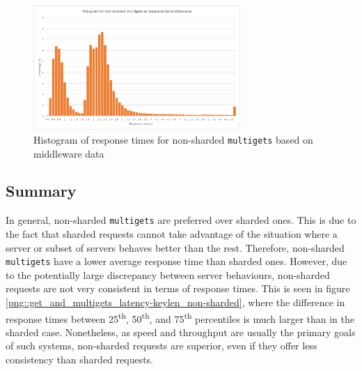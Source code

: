 \documentclass[11pt,a4paper]{article}
\begin{document}
\begin{figure}[!h]
    \centering
    \includegraphics[width=0.7\textwidth]{processing/graphics/get_and_multigets_hist_non-sharded_mws.png}
    \caption{Histogram of response times for non-sharded \texttt{multigets} based on middleware data}
    \label{png::get_and_multigets_hist_non-sharded_mws}
\end{figure}

\subsection{Summary}
In general, non-sharded \texttt{multigets} are preferred over sharded ones. This is due to the fact that sharded requests cannot take advantage of the situation where a server or subset of servers behaves better than the rest. Therefore, non-sharded \texttt{multigets} have a lower average response time than sharded ones. However, due to the potentially large discrepancy between server behaviours, non-sharded requests are not very consistent in terms of response times. This is seen in figure \ref{png::get_and_multigets_latency-keylen_non-sharded}, where the difference in response times between 25\textsuperscript{th}, 50\textsuperscript{th}, and 75\textsuperscript{th} percentiles is much larger than in the sharded case. Nonetheless, as speed and throughput are usually the primary goals of such systems, non-sharded requests are superior, even if they offer less consistency than sharded requests.



\newpage
\end{document}
